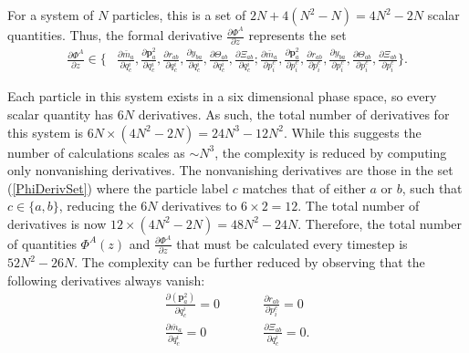 \documentclass[aps,onecolumn,notitlepage,eqsecnum,nofootinbib,floatfix,superscriptaddress]{revtex4-1}
\begin{document}
For a system of $N$ particles, this is a set of $2N+ 4(N^{2}- N)= 4N^{2}- 2 N$ scalar quantities. Thus, the formal derivative $\frac{\partial \Phi^{A} }{\partial z}$ represents the set
\begin{equation} \label{PhiDerivSet}
\begin{aligned}
  \frac{\partial \Phi^{A}}{\partial z}\in \biggl\{&\frac{\partial\bar{m}_{a}}{\partial q^i_c},\frac{\partial\mathbf{p}^{2}_{a}}{\partial q^i_c},\frac{\partial r_{ab}}{\partial q^i_c},\frac{\partial y_{ba}}{\partial q^i_c},\frac{\partial\Theta_{ab}}{\partial q^i_c},\frac{\partial\Xi_{ab}}{\partial q^i_c}; \frac{\partial\bar{m}_{a}}{\partial p_i^c},\frac{\partial\mathbf{p}^{2}_{a}}{\partial p_i^c},\frac{\partial r_{ab}}{\partial p_i^c},\frac{\partial y_{ba}}{\partial p_i^c},\frac{\partial\Theta_{ab}}{\partial p_i^c},\frac{\partial\Xi_{ab}}{\partial p_i^c}\biggr\}.
\end{aligned}
\end{equation}

Each particle in this system exists in a six dimensional phase space, so every scalar quantity has $6N$ derivatives. As such, the total number of derivatives for this system is $6N\times (4N^{2}- 2 N)= 24N^{3}- 12N^{2}$. While this suggests the number of calculations scales as $\sim N^{3}$, the complexity is reduced by computing only nonvanishing derivatives. The nonvanishing derivatives are those in the set (\ref{PhiDerivSet}) where the particle label $c$ matches that of either $a$ or $b$, such that $c\in \{a,b\}$, reducing the $6N$ derivatives to $6\times 2= 12$. The total number of derivatives is now $12\times (4N^{2}-  2N)= 48N^{2}- 24N$. Therefore, the total number of quantities $\Phi^{A}(z)$ and $\frac{\partial \Phi^{A}}{\partial z}$ that must be calculated every timestep is $52N^{2}- 26N$. The complexity can be further reduced by observing that the following derivatives always vanish:
\begin{equation}
\begin{aligned} 
  \frac{\partial(\mathbf{p}^{2}_{a})}{\partial q^i_c}= 0 & \>\>\>\>\>\>\>\> & \frac{\partial r_{ab}}{\partial p_i^c}= 0 \\
  \frac{\partial\bar{m}_{a}}{\partial q^i_c}= 0 & \>\>\>\>\>\>\>\> & \frac{\partial\Xi_{ab}}{\partial q^i_c}= 0.
\end{aligned}
\end{equation}
\end{document}
